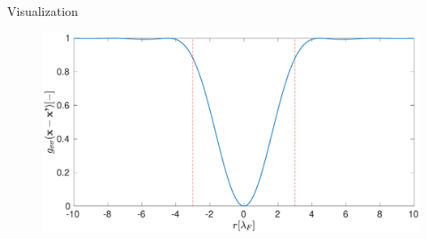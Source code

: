 \begin{frame}{Visualization}
\begin{figure}
\includegraphics[width=\textwidth]{images/Density}
\end{figure}
\end{frame}